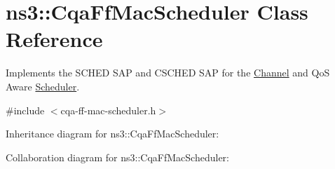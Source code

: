 \hypertarget{classns3_1_1CqaFfMacScheduler}{}\section{ns3\+:\+:Cqa\+Ff\+Mac\+Scheduler Class Reference}
\label{classns3_1_1CqaFfMacScheduler}


Implements the S\+C\+H\+ED S\+AP and C\+S\+C\+H\+ED S\+AP for the \hyperlink{classns3_1_1Channel}{Channel} and QoS Aware \hyperlink{classns3_1_1Scheduler}{Scheduler}.  




{\ttfamily \#include $<$cqa-\/ff-\/mac-\/scheduler.\+h$>$}



Inheritance diagram for ns3\+:\+:Cqa\+Ff\+Mac\+Scheduler\+:


Collaboration diagram for ns3\+:\+:Cqa\+Ff\+Mac\+Scheduler\+:
